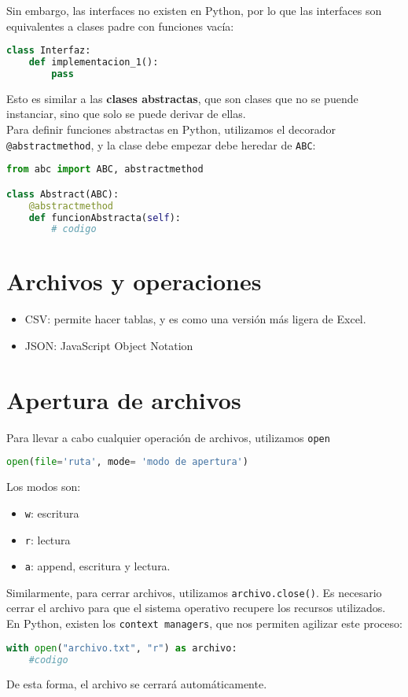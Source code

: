 \documentclass{./Programacion.tex}
\begin{document}
Sin embargo, las interfaces no existen en Python, por lo que las interfaces son equivalentes a clases padre con funciones vacía:
\begin{lstlisting}[language=python]
class Interfaz:
	def implementacion_1():
		pass
\end{lstlisting}
Esto es similar a las \textbf{clases abstractas}, que son clases que no se puende instanciar, sino que solo se puede derivar de ellas.\\
Para definir funciones abstractas en Python, utilizamos el decorador \verb|@abstractmethod|, y la clase debe empezar debe heredar de \verb|ABC|:
\begin{lstlisting}[language=python]
from abc import ABC, abstractmethod

class Abstract(ABC):
	@abstractmethod
	def funcionAbstracta(self):
		# codigo
\end{lstlisting}
\section{Archivos y operaciones}
\begin{itemize}
  \item CSV: permite hacer tablas, y es como una versión más ligera de Excel.
  \item JSON: JavaScript Object Notation
\end{itemize}
\section{Apertura de archivos}
Para llevar a cabo cualquier operación de archivos, utilizamos \verb|open|
\begin{lstlisting}[language=python]
open(file='ruta', mode= 'modo de apertura')
\end{lstlisting}
Los modos son:
\begin{itemize}
  \item \verb|w|: escritura
\item \verb|r|: lectura
\item \verb|a|: append, escritura y lectura.
\end{itemize}
Similarmente, para cerrar archivos, utilizamos \verb|archivo.close()|. Es necesario cerrar el archivo para que el sistema operativo recupere los recursos utilizados. En Python, existen los \verb|context managers|, que nos permiten agilizar este proceso:
\begin{lstlisting}[language=python]
with open("archivo.txt", "r") as archivo:
	#codigo
\end{lstlisting}
De esta forma, el archivo se cerrará automáticamente.
\end{document}
